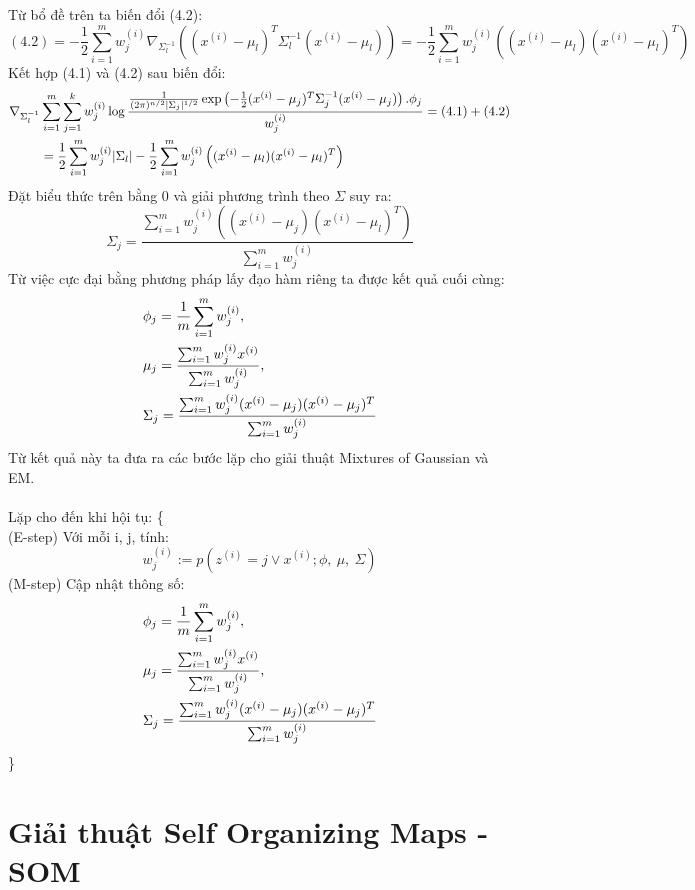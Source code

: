  Từ bổ đề trên ta biến đổi (4.2):
\[ (4.2) = -\frac{1}{2} \sum_{i=1}^{m} w_{j}^{(i)} \nabla_{\Sigma_l^{-1}} \left( 
(x^{(i)}-\mu_l)^T \Sigma_l^{-1} (x^{(i)}-\mu_l) \right) = -\frac{1}{2} \sum_{i=1}^{m} w_{j}^{(i)} \left( 
(x^{(i)}-\mu_l) (x^{(i)}-\mu_l)^T \right) \]
Kết hợp (4.1) và (4.2) sau biến đổi:
\begin{align}
\nabla_{\Sigma_l^{-1}} & \sum_{i=1}^{m} \sum_{j=1}^{k} w_{j}^{(i)} \log
\frac{\frac{1}{(2\pi)^{n/2}|\Sigma_j|^{1/2}}\exp\left( -\frac{1}{2}
(x^{(i)}-\mu_j)^T \Sigma_j^{-1} (x^{(i)}-\mu_j)
\right).\phi_j}{w_{j}^{(i)}} = (4.1) + (4.2) \notag\\
& = \frac{1}{2} \sum_{i=1}^{m} w_{j}^{(i)} |\Sigma_l| -\frac{1}{2} \sum_{i=1}^{m}
w_{j}^{(i)} \left( (x^{(i)}-\mu_l) (x^{(i)}-\mu_l)^T \right)\notag
\end{align}
Đặt biểu thức trên bằng 0 và giải phương trình theo $\Sigma$ suy ra:
\[ \Sigma_j = \frac{\sum_{i=1}^{m}
w_{j}^{(i)} \left( (x^{(i)}-\mu_j) (x^{(i)}-\mu_l)^T \right)}{\sum_{i=1}^{m}
w_{j}^{(i)}} \]
Từ việc cực đại bằng phương pháp lấy đạo hàm riêng ta được kết quả cuối cùng:
\begin{align}
& \phi_j = \frac{1}{m}\sum_{i=1}^m w_j^{(i)},\notag\\
& \mu_j = \frac{\sum_{i=1}^m w_j^{(i)} x^{(i)}}{\sum_{i=1}^m
w_j^{(i)}},\notag\\
& \Sigma_j = \frac{\sum_{i=1}^m w_j^{(i)} (x^{(i)}-\mu_j)
(x^{(i)}-\mu_j)^T}{\sum_{i=1}^m w_j^{(i)}}\notag
\end{align}
Từ kết quả này ta đưa ra các bước lặp cho giải thuật Mixtures of Gaussian và
EM.\\\\
Lặp cho đến khi hội tụ: \{\\
\tab (E-step) Với mỗi i, j, tính:
\[ w_j^{(i)} := p(z^{(i)} = j \vee x^{(i)}; \phi,\:\mu,\:\Sigma) \]
\tab (M-step) Cập nhật thông số:
\begin{align}
& \phi_j = \frac{1}{m}\sum_{i=1}^m w_j^{(i)},\notag\\
& \mu_j = \frac{\sum_{i=1}^m w_j^{(i)} x^{(i)}}{\sum_{i=1}^m
w_j^{(i)}},\notag\\
& \Sigma_j = \frac{\sum_{i=1}^m w_j^{(i)} (x^{(i)}-\mu_j)
(x^{(i)}-\mu_j)^T}{\sum_{i=1}^m w_j^{(i)}}\notag
\end{align}
\}
\section{Giải thuật Self Organizing Maps - SOM}
